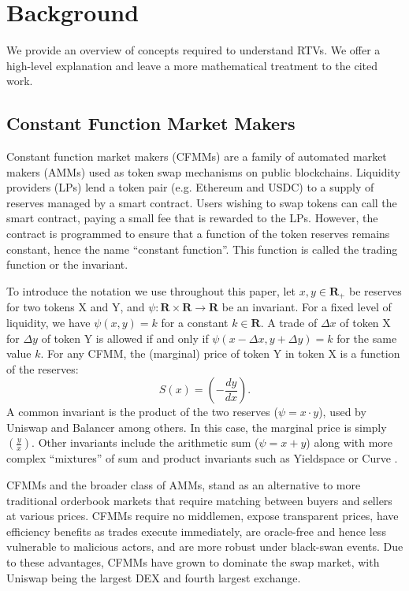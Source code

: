 \documentclass[hidelinks, 12pt]{article}
\begin{document}
\section{Background}

We provide an overview of concepts required to understand RTVs. We offer a high-level explanation and leave a more mathematical treatment to the cited work.

\subsection{Constant Function Market Makers}

Constant function market makers (CFMMs) are a family of automated market makers (AMMs) used as token swap mechanisms on public blockchains. Liquidity providers (LPs) lend a token pair (e.g. Ethereum and USDC) to a supply of reserves managed by a smart contract. Users wishing to swap tokens can call the smart contract, paying a small fee that is rewarded to the LPs. However, the contract is programmed to ensure that a function of the token reserves remains constant, hence the name ``constant function''. This function is called the trading function or the invariant.

To introduce the notation we use throughout this paper, let $x, y \in \mathbf{R}_+$ be reserves for two tokens X and Y, and $\psi: \mathbf{R} \times \mathbf{R} \rightarrow \mathbf{R}$ be an invariant. For a fixed level of liquidity, we have $\psi(x, y) = k$ for a constant $k \in \mathbf{R}$. A trade of $\Delta x$ of token X for $\Delta y$ of token Y is allowed if and only if $\psi(x - \Delta x, y + \Delta y) = k$ for the same value $k$. For any CFMM, the (marginal) price of token Y in token X is a function of the reserves:
\[S(x) = \left(-\frac{dy}{dx}\right).\]
A common invariant is the product of the two reserves ($\psi = x\cdot y$), used by Uniswap \cite{angeris2019analysis,adams2021uniswap} and Balancer \cite{martinelli2019non} among others.
In this case, the marginal price is simply $\left(\frac{y}{x}\right)$.
Other invariants include the arithmetic sum ($\psi = x + y$) along with more complex ``mixtures'' of sum and product invariants such as Yieldspace \cite{niemerg2020yieldspace} or Curve \cite{egorov2021automatic}.

CFMMs and the broader class of AMMs, stand as an alternative to more traditional orderbook markets that require matching between buyers and sellers at various prices. CFMMs require no middlemen, expose transparent prices, have efficiency benefits as trades execute immediately, are oracle-free and hence less vulnerable to malicious actors, and are more robust under black-swan events. Due to these advantages, CFMMs have grown to dominate the swap market, with Uniswap being the largest DEX and fourth largest exchange.
\end{document}
